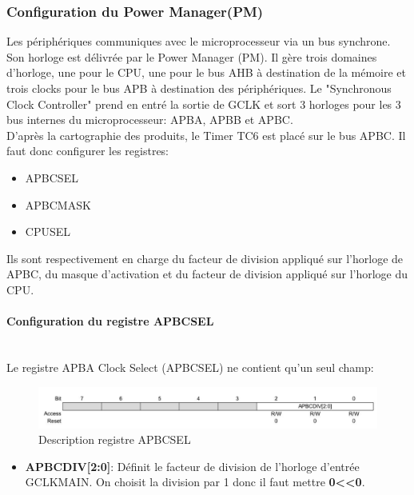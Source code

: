 \documentclass[a4paper]{article}
\begin{document}
	\subsubsection{Configuration du Power Manager(PM)} 
	Les périphériques communiques avec le microprocesseur via un bus synchrone. Son horloge est délivrée par le Power Manager (PM).
	Il gère trois domaines d'horloge, une pour le CPU, une pour le bus AHB à destination de la mémoire et trois clocks pour le bus APB à destination des périphériques.
	Le "Synchronous Clock Controller" prend en entré la sortie de GCLK et sort 3 horloges pour les 3 bus internes du microprocesseur: APBA, APBB et APBC.\\
	D'après la cartographie des produits, le Timer TC6 est placé sur le bus APBC. Il faut donc configurer les registres:
	\begin{itemize}
		\item {APBCSEL}
		\item {APBCMASK}
		\item {CPUSEL}
	\end{itemize}
Ils sont respectivement en charge du facteur de division appliqué sur l'horloge de APBC, du masque d'activation et du facteur de division appliqué sur l'horloge du CPU.
	\newpage
	\paragraph{Configuration du registre APBCSEL} 
	~~\\
	Le registre APBA Clock Select (APBCSEL) ne contient qu'un seul champ:\\
	\begin{figure}[H]
		\centering
		\includegraphics[width=0.9\linewidth]{APBCSEL.jpg}
		\caption{Description registre APBCSEL}
	\end{figure}
	
	\begin{itemize}
		\item {\bf APBCDIV[2:0]}: Définit le facteur de division de l'horloge d'entrée GCLKMAIN. On choisit la division par 1 donc il faut mettre {\bf 0\textless\textless0}.~~\\
	\end{itemize}
	
\end{document}
